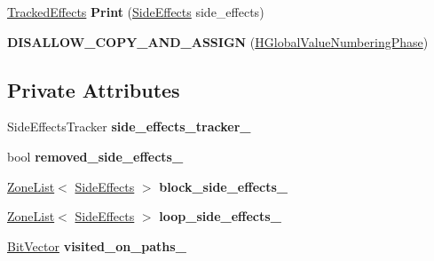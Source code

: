 \begin{DoxyCompactItemize}
\item 
\hyperlink{structv8_1_1internal_1_1_tracked_effects}{Tracked\+Effects} {\bfseries Print} (\hyperlink{classv8_1_1internal_1_1_side_effects}{Side\+Effects} side\+\_\+effects)\hypertarget{classv8_1_1internal_1_1_h_global_value_numbering_phase_a11102009939ef513fe4b4fee5ce37799}{}\label{classv8_1_1internal_1_1_h_global_value_numbering_phase_a11102009939ef513fe4b4fee5ce37799}

\item 
{\bfseries D\+I\+S\+A\+L\+L\+O\+W\+\_\+\+C\+O\+P\+Y\+\_\+\+A\+N\+D\+\_\+\+A\+S\+S\+I\+GN} (\hyperlink{classv8_1_1internal_1_1_h_global_value_numbering_phase}{H\+Global\+Value\+Numbering\+Phase})\hypertarget{classv8_1_1internal_1_1_h_global_value_numbering_phase_a219ee2a51058825581ff1999e0891c86}{}\label{classv8_1_1internal_1_1_h_global_value_numbering_phase_a219ee2a51058825581ff1999e0891c86}

\end{DoxyCompactItemize}
\subsection*{Private Attributes}
\begin{DoxyCompactItemize}
\item 
Side\+Effects\+Tracker {\bfseries side\+\_\+effects\+\_\+tracker\+\_\+}\hypertarget{classv8_1_1internal_1_1_h_global_value_numbering_phase_a1c04441f88a245e568ed7fc96f6cea89}{}\label{classv8_1_1internal_1_1_h_global_value_numbering_phase_a1c04441f88a245e568ed7fc96f6cea89}

\item 
bool {\bfseries removed\+\_\+side\+\_\+effects\+\_\+}\hypertarget{classv8_1_1internal_1_1_h_global_value_numbering_phase_af31d11abe7dd185837f5817d60d42222}{}\label{classv8_1_1internal_1_1_h_global_value_numbering_phase_af31d11abe7dd185837f5817d60d42222}

\item 
\hyperlink{classv8_1_1internal_1_1_zone_list}{Zone\+List}$<$ \hyperlink{classv8_1_1internal_1_1_side_effects}{Side\+Effects} $>$ {\bfseries block\+\_\+side\+\_\+effects\+\_\+}\hypertarget{classv8_1_1internal_1_1_h_global_value_numbering_phase_a429a88942ac1d1b91e8e08ae4d3890a4}{}\label{classv8_1_1internal_1_1_h_global_value_numbering_phase_a429a88942ac1d1b91e8e08ae4d3890a4}

\item 
\hyperlink{classv8_1_1internal_1_1_zone_list}{Zone\+List}$<$ \hyperlink{classv8_1_1internal_1_1_side_effects}{Side\+Effects} $>$ {\bfseries loop\+\_\+side\+\_\+effects\+\_\+}\hypertarget{classv8_1_1internal_1_1_h_global_value_numbering_phase_a027fa38e0281606995d7c47b94190b61}{}\label{classv8_1_1internal_1_1_h_global_value_numbering_phase_a027fa38e0281606995d7c47b94190b61}

\item 
\hyperlink{classv8_1_1internal_1_1_bit_vector}{Bit\+Vector} {\bfseries visited\+\_\+on\+\_\+paths\+\_\+}\hypertarget{classv8_1_1internal_1_1_h_global_value_numbering_phase_a93eba5221fbaf1049ef8bdd273d556fb}{}\label{classv8_1_1internal_1_1_h_global_value_numbering_phase_a93eba5221fbaf1049ef8bdd273d556fb}

\end{DoxyCompactItemize}
